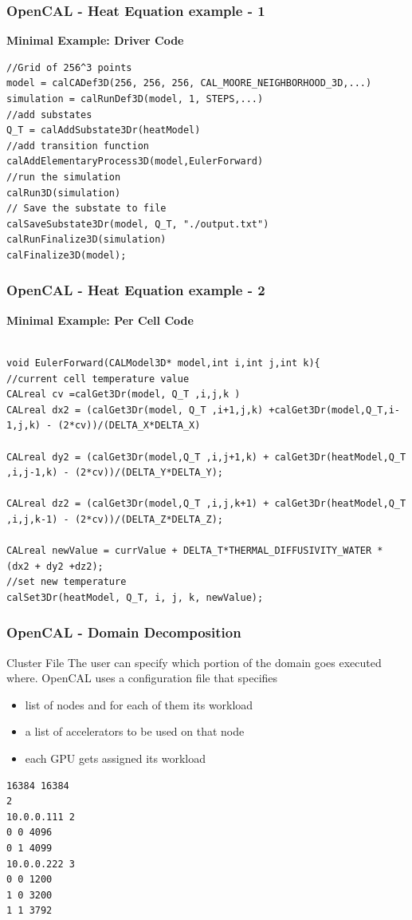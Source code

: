 \begin{frame}[fragile]
\frametitle{OpenCAL - Heat Equation example - 1} 
\centering\textbf{Minimal Example: Driver Code}
  \begin{lstlisting}[numbers=none]
//Grid of 256^3 points
model = calCADef3D(256, 256, 256, CAL_MOORE_NEIGHBORHOOD_3D,...)
simulation = calRunDef3D(model, 1, STEPS,...)
//add substates
Q_T = calAddSubstate3Dr(heatModel)
//add transition function
calAddElementaryProcess3D(model,EulerForward)
//run the simulation
calRun3D(simulation)
// Save the substate to file
calSaveSubstate3Dr(model, Q_T, "./output.txt")
calRunFinalize3D(simulation)
calFinalize3D(model);
\end{lstlisting}
\end{frame}
\begin{frame}[fragile]
\frametitle{OpenCAL - Heat Equation example - 2} 
\centering\textbf{Minimal Example: Per Cell Code}
\begin{lstlisting}[numbers=none]

void EulerForward(CALModel3D* model,int i,int j,int k){
//current cell temperature value
CALreal cv =calGet3Dr(model, Q_T ,i,j,k )
CALreal dx2 = (calGet3Dr(model, Q_T ,i+1,j,k) +calGet3Dr(model,Q_T,i-1,j,k) - (2*cv))/(DELTA_X*DELTA_X)

CALreal dy2 = (calGet3Dr(model,Q_T ,i,j+1,k) + calGet3Dr(heatModel,Q_T ,i,j-1,k) - (2*cv))/(DELTA_Y*DELTA_Y);

CALreal dz2 = (calGet3Dr(model,Q_T ,i,j,k+1) + calGet3Dr(heatModel,Q_T ,i,j,k-1) - (2*cv))/(DELTA_Z*DELTA_Z);

CALreal newValue = currValue + DELTA_T*THERMAL_DIFFUSIVITY_WATER * (dx2 + dy2 +dz2);
//set new temperature
calSet3Dr(heatModel, Q_T, i, j, k, newValue);

\end{lstlisting}
\end{frame}


\begin{frame}[fragile]
\frametitle{OpenCAL - Domain Decomposition} 
	\begin{block}{Cluster File}
		The user can specify which portion of the domain goes executed where.
		OpenCAL uses a configuration file that specifies
		\begin{itemize}
			\item list of nodes and for each of them its workload
			\item a list of accelerators to be used on that node
			\item each GPU gets assigned its workload
		\end{itemize}
	\end{block}
\begin{lstlisting}[numbers=none, basicstyle=\small]
16384 16384
2
10.0.0.111 2
0 0 4096
0 1 4099
10.0.0.222 3
0 0 1200
1 0 3200
1 1 3792
\end{lstlisting}
\end{frame}


